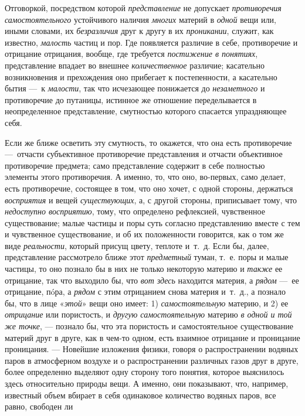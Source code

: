 Отговоркой, посредством которой {\em представление} не
допускает {\em противоречия самостоятельного}
устойчивого наличия {\em многих} материй в
{\em одной} вещи или, иными словами, их
{\em безразличия} друг к другу в их
{\em проникании}, служит, как известно,
{\em малость} частиц и пор. Где появляется различие в
себе, противоречие и отрицание отрицания, вообще, где требуется
{\em постижение в понятиях}, представление впадает во
внешнее {\em количественное} различие; касательно
возникновения и прехождения оно прибегает к постепенности, а касательно
бытия —~к {\em малости}, так что исчезающее понижается
до {\em незаметного} и противоречие до путаницы,
истинное же отношение переделывается в неопределенное представление,
смутностью которого спасается упраздняющее себя.

Если же ближе осветить эту смутность, то окажется, что она есть противоречие
—~отчасти субъективное противоречие представления и отчасти объективное
противоречие предмета; само представление содержит в себе полностью
элементы этого противоречия. А именно, то, что оно, во-первых, само делает,
есть противоречие, состоящее в том, что оно хочет, с одной стороны,
держаться {\em восприятия} и вещей
{\em существующих}, а, с другой стороны, приписывает
тому, что {\em недоступно восприятию}, тому, что
определено рефлексией, чувственное существование; малые частицы и поры суть
согласно представлению вместе с тем и чувственное существование, и об их
положенности говорится, как о том же виде
{\em реальности}, который присущ цвету, теплоте и~т.~д.
Если бы, далее, представление рассмотрело ближе этот
{\em предметный} туман, т.~е. поры и малые частицы, то
оно познало бы в них не только некоторую материю и
{\em также} ее отрицание, так что выходило бы, что
{\em вот здесь} находится материя, а
{\em рядом} —~ее отрицание, пóра, а
{\em рядом} с этим отрицанием снова материя и~т.~д., а
познало бы, что в лице «{\em этой}» вещи оно имеет: 1)
{\em самостоятельную} материю, и 2) ее
{\em отрицание} или пористость, и
{\em другую самостоятельную} материю
{\em в одной и той же точке}, — познало бы, что эта
пористость и самостоятельное существование материй друг в друге, как в
чем-то одном, есть взаимное отрицание и проницание проницания. — Новейшие
изложения физики, говоря о распространении водяных паров в атмосферном
воздухе и о распространении различных газов друг в друге, более определенно
выделяют одну сторону того понятия, которое выяснилось здесь относительно
природы вещи. А именно, они показывают, что, например, известный объем
вбирает в себя одинаковое количество водяных паров, все равно, свободен ли
